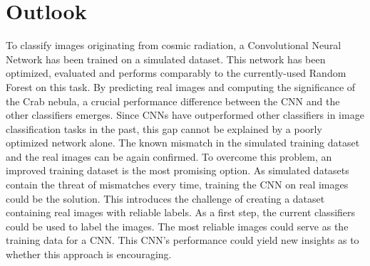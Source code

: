\section{Outlook}
To classify images originating from cosmic radiation, a Convolutional Neural Network has been trained on a simulated dataset.
This network has been optimized, evaluated and performs comparably to the currently-used Random Forest on this task.
By predicting real images and computing the significance of the Crab nebula, a crucial performance difference between
the CNN and the other classifiers emerges.
Since CNNs have outperformed other classifiers in image classification tasks in the past,
this gap cannot be explained by a poorly optimized network alone.
The known mismatch in the simulated training dataset and the real images can be again confirmed.
To overcome this problem, an improved training dataset is the most promising option.
As simulated datasets contain the threat of mismatches every time,
training the CNN on real images could be the solution.
This introduces the challenge of creating a dataset containing real images with reliable labels.
As a first step, the current classifiers could be used to label the images.
The most reliable images could serve as the training data for a CNN.
This CNN's performance could yield new insights as to whether this approach is encouraging.
